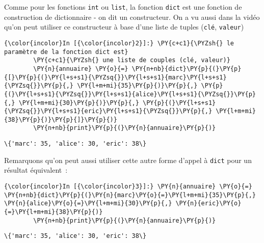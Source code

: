     Comme pour les fonctions \texttt{int} ou \texttt{list}, la fonction
\texttt{dict} est une fonction de construction de dictionnaire - on dit
un constructeur. On a vu aussi dans la vidéo qu'on peut utiliser ce
constructeur à base d'une liste de tuples (\texttt{clé},
\texttt{valeur})

    \begin{Verbatim}[commandchars=\\\{\},frame=single,framerule=0.3mm,rulecolor=\color{cellframecolor}]
{\color{incolor}In [{\color{incolor}2}]:} \PY{c+c1}{\PYZsh{} le paramètre de la fonction dict est}
        \PY{c+c1}{\PYZsh{} une liste de couples (clé, valeur)}
        \PY{n}{annuaire} \PY{o}{=} \PY{n+nb}{dict}\PY{p}{(}\PY{p}{[}\PY{p}{(}\PY{l+s+s1}{\PYZsq{}}\PY{l+s+s1}{marc}\PY{l+s+s1}{\PYZsq{}}\PY{p}{,} \PY{l+m+mi}{35}\PY{p}{)}\PY{p}{,} \PY{p}{(}\PY{l+s+s1}{\PYZsq{}}\PY{l+s+s1}{alice}\PY{l+s+s1}{\PYZsq{}}\PY{p}{,} \PY{l+m+mi}{30}\PY{p}{)}\PY{p}{,} \PY{p}{(}\PY{l+s+s1}{\PYZsq{}}\PY{l+s+s1}{eric}\PY{l+s+s1}{\PYZsq{}}\PY{p}{,} \PY{l+m+mi}{38}\PY{p}{)}\PY{p}{]}\PY{p}{)}
        \PY{n+nb}{print}\PY{p}{(}\PY{n}{annuaire}\PY{p}{)}
\end{Verbatim}


    \begin{Verbatim}[commandchars=\\\{\},frame=single,framerule=0.3mm,rulecolor=\color{cellframecolor}]
\{'marc': 35, 'alice': 30, 'eric': 38\}
\end{Verbatim}

    Remarquons qu'on peut aussi utiliser cette autre forme d'appel à
\texttt{dict} pour un résultat équivalent~:

    \begin{Verbatim}[commandchars=\\\{\},frame=single,framerule=0.3mm,rulecolor=\color{cellframecolor}]
{\color{incolor}In [{\color{incolor}3}]:} \PY{n}{annuaire} \PY{o}{=} \PY{n+nb}{dict}\PY{p}{(}\PY{n}{marc}\PY{o}{=}\PY{l+m+mi}{35}\PY{p}{,} \PY{n}{alice}\PY{o}{=}\PY{l+m+mi}{30}\PY{p}{,} \PY{n}{eric}\PY{o}{=}\PY{l+m+mi}{38}\PY{p}{)}
        \PY{n+nb}{print}\PY{p}{(}\PY{n}{annuaire}\PY{p}{)}
\end{Verbatim}


    \begin{Verbatim}[commandchars=\\\{\},frame=single,framerule=0.3mm,rulecolor=\color{cellframecolor}]
\{'marc': 35, 'alice': 30, 'eric': 38\}
\end{Verbatim}

